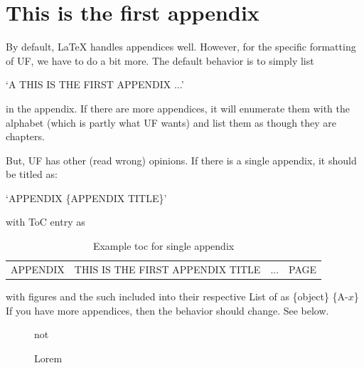 \documentclass[../main.tex]{subfiles}
\begin{document}
\chapter{This is the first appendix}
By default, LaTeX handles appendices well. However, for the specific formatting of UF, we have to do a bit more. The default behavior is to simply list\begin{center}
    `A THIS IS THE FIRST APPENDIX ...'
\end{center}
in the appendix. If there are more appendices, it will enumerate them with the alphabet (which is partly what UF wants) and list them as though they are chapters.

But, UF has other (read wrong) opinions. If there is a single appendix, it should be titled as:
\begin{center}
    `APPENDIX \{APPENDIX TITLE\}'
\end{center}
with ToC entry as
\begin{table}[]
    \centering
    \begin{tabular}{l l c r}
        APPENDIX& THIS IS THE FIRST APPENDIX TITLE& ... & PAGE\\
    \end{tabular}
    \caption[Example toc for single appendix]{Example toc for single appendix}
    \label{tab:AppendixToC}
\end{table}
with figures and the such included into their respective List of {\*} as \{object\} \{A-$x$\}
If you have more appendices, then the behavior should change. See below.
\begin{figure}
    \centering
        not
    \caption[Appendixfigure]{Lorem}
    \label{fig:AppFig1}
\end{figure}
\end{document}
